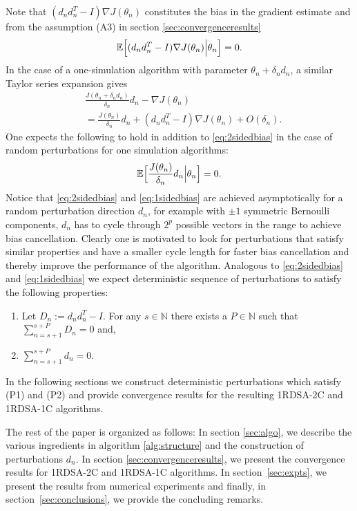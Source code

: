 \documentclass[letterpaper, 10 pt, conference]{ieeeconf}  %
\begin{document}
Note that $(d_nd_n^T-I)\nabla J(\theta_n)$ constitutes the bias in the
gradient estimate and
from the assumption (A3) in section \ref{sec:convergenceresults}
\begin{equation}\label{eq:2sidedbias}
\mathbb{E}\Big{[}(d_nd_n^T-I)\nabla J(\theta_n)\Big{|}\theta_n\Big{]}=0.
\end{equation}
In the case of a one-simulation algorithm with parameter $\theta_n+\delta_n d_n$,
a similar Taylor series expansion gives
\begin{align}\label{eq:1sided}
&\frac{J(\theta_n+\delta_n d_n)}{\delta_n}d_n
- \nabla J(\theta_n) \\
&=\frac{J(\theta_n)}{\delta_n}d_n
+(d_nd_n^T-I)\nabla J(\theta_n)+O(\delta_n).
\end{align}
One expects the following to hold in addition to \eqref{eq:2sidedbias} in the case of 
random perturbations for one simulation algorithms:
\begin{equation}\label{eq:1sidedbias}
\mathbb{E}\Big{[}\frac{J(\theta_n)}{\delta_n}d_n\Big{|}\theta_n\Big{]}=0. 
\end{equation}
Notice that \eqref{eq:2sidedbias} and \eqref{eq:1sidedbias} are achieved asymptotically 
for a random perturbation direction $d_n$, for example with $\pm 1$ symmetric Bernoulli 
components, $d_n$ has to cycle through $2^p$ possible vectors in the range to achieve bias 
cancellation. Clearly one is motivated to look for perturbations that satisfy similar 
properties and have a smaller cycle length for faster bias cancellation and thereby 
improve the performance of the algorithm. 
Analogous to \eqref{eq:2sidedbias} and \eqref{eq:1sidedbias} we expect deterministic sequence 
of perturbations to satisfy the following properties:
\begin{enumerate}[label=\textbf{(P\arabic*)}]
  \item Let $D_n:=d_nd_n^T-I.$ For any $s \in \mathbb{N}$ there exists a 
  $P \in \mathbb{N}$ such that $\sum\limits_{n=s+1}^{s+P}D_n=0$ and,
  \item  $\sum\limits_{n=s+1}^{s+P}d_n=0.$
\end{enumerate}
In the following sections we construct deterministic perturbations which satisfy (P1) and (P2)
and provide convergence results for the resulting 1RDSA-2C and 1RDSA-1C algorithms.

The rest of the paper is organized as follows: In section \ref{sec:algo}, we
describe the various ingredients in algorithm \ref{alg:structure} and the construction
of perturbations $d_n$.
In section \ref{sec:convergenceresults}, 
we present the convergence results for 1RDSA-2C and 1RDSA-1C algorithms.
In section~\ref{sec:expts}, we present the results from numerical experiments and finally, 
in section~\ref{sec:conclusions}, we provide the concluding remarks.
\end{document}
